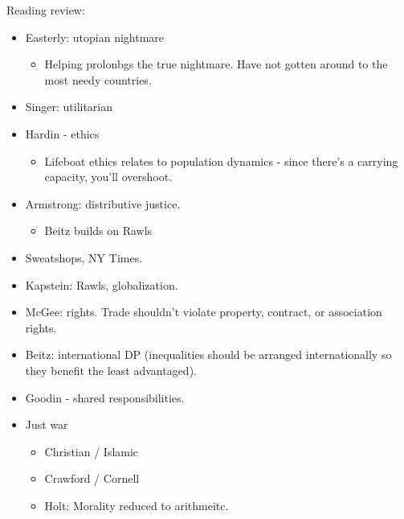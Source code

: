 \documentclass{article}
\begin{document}
Reading review:

\begin{itemize}
  \item Easterly: utopian nightmare
    \begin{itemize}
      \item Helping prolonbgs the true nightmare.  Have not gotten around to the most needy countries.
    \end{itemize}
  \item Singer: utilitarian
  \item Hardin - ethics
    \begin{itemize}
      \item Lifeboat ethics relates to population dynamics - since there's a carrying capacity, you'll overshoot.
    \end{itemize}
  \item Armstrong: distributive justice.
    \begin{itemize}
      \item Beitz builds on Rawls
    \end{itemize}
  \item Sweatshops, NY Times.
  \item Kapstein: Rawls, globalization.
  \item McGee: rights.  Trade shouldn't violate property, contract, or association rights.
  \item Beitz: international DP (inequalities should be arranged internationally so they benefit the least advantaged). 
  \item Goodin - shared responsibilities.  
  \item Just war
    \begin{itemize}
      \item Christian / Islamic
      \item Crawford / Cornell
      \item Holt: Morality reduced to arithmeitc.
    \end{itemize}
\end{itemize}
\end{document}
